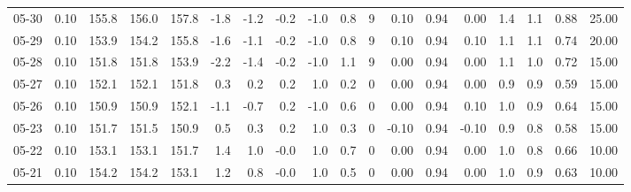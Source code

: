 \begin{threeparttable}
{\begin{tabular}{lrrrrrrrrrrrrrrrrr}
  05-30 &     0.10 & 155.8 & 156.0 & 157.8 &       -1.8 &           -1.2 &                      -0.2 &                     -1.0 &                 0.8 &              9 &       0.10 &      0.94 &           0.00 &              1.4 &                 1.1 &            0.88 &                  25.00 \\
  05-29 &     0.10 & 153.9 & 154.2 & 155.8 &       -1.6 &           -1.1 &                      -0.2 &                     -1.0 &                 0.8 &              9 &       0.10 &      0.94 &           0.10 &              1.1 &                 1.1 &            0.74 &                  20.00 \\
  05-28 &     0.10 & 151.8 & 151.8 & 153.9 &       -2.2 &           -1.4 &                      -0.2 &                     -1.0 &                 1.1 &              9 &       0.00 &      0.94 &           0.00 &              1.1 &                 1.0 &            0.72 &                  15.00 \\
  05-27 &     0.10 & 152.1 & 152.1 & 151.8 &        0.3 &            0.2 &                       0.2 &                      1.0 &                 0.2 &              0 &       0.00 &      0.94 &           0.00 &              0.9 &                 0.9 &            0.59 &                  15.00 \\
  05-26 &     0.10 & 150.9 & 150.9 & 152.1 &       -1.1 &           -0.7 &                       0.2 &                     -1.0 &                 0.6 &              0 &       0.00 &      0.94 &           0.10 &              1.0 &                 0.9 &            0.64 &                  15.00 \\
  05-23 &     0.10 & 151.7 & 151.5 & 150.9 &        0.5 &            0.3 &                       0.2 &                      1.0 &                 0.3 &              0 &      -0.10 &      0.94 &          -0.10 &              0.9 &                 0.8 &            0.58 &                  15.00 \\
  05-22 &     0.10 & 153.1 & 153.1 & 151.7 &        1.4 &            1.0 &                      -0.0 &                      1.0 &                 0.7 &              0 &       0.00 &      0.94 &           0.00 &              1.0 &                 0.8 &            0.66 &                  10.00 \\
  05-21 &     0.10 & 154.2 & 154.2 & 153.1 &        1.2 &            0.8 &                      -0.0 &                      1.0 &                 0.5 &              0 &       0.00 &      0.94 &           0.00 &              1.0 &                 0.9 &            0.63 &                  10.00 \\

\end{tabular}}
\end{threeparttable}
